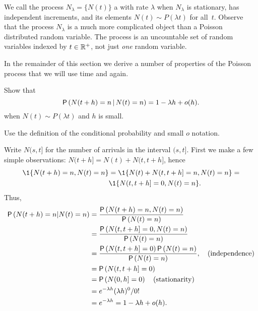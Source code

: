 We call the process $N_\lambda=\{N(t)\}$ a  with rate $\lambda$ when $N_\lambda$ is stationary, has independent increments, and its elements $N(t)\sim P(\lambda t)$ for all~$t$.
Observe that the process $N_\lambda$ is a much more complicated object than a Poisson distributed random variable.
The process is an uncountable set of random variables indexed by $t\in \mathbb{R}^+$, not just \emph{one} random variable.


In the remainder of this section we derive a number of  properties of the Poisson process that we will use time and again.


\begin{exercise}\label{ex:35}
  Show that 
  \begin{equation*}
\P{N(t+h) = n \given N(t) = n} = 1-\lambda h + o(h).
  \end{equation*}
when $N(t) \sim P(\lambda t)$  and $h$ is small. 
\begin{hint}
Use  the definition of the conditional probability and small $o$ notation.

\end{hint}
\begin{solution}
Write $N(s, t]$ for the number of arrivals in the interval $(s,t]$. First we make a few simple observations: $N(t+h]= N(t) + N(t, t+h]$, hence
\begin{equation*}
  \begin{split}
  \1{N(t+h)=n, N(t)=n}
&=  \1{N(t) + N(t, t+h] = n, N(t)=n} = \\
&\1{N(t, t+h] = 0, N(t)=n}.
  \end{split}
\end{equation*}
Thus, 
    \begin{align*}
  \P{N(t+h) = n | N(t) = n} 
&=  \frac{\P{N(t+h) = n, N(t) = n}}{\P{N(t)=n}} \\
&=  \frac{\P{N(t, t+h] = 0,  N(t) = n}}{\P{N(t)=n}} \\
&=  \frac{\P{N(t, t+h] = 0} \P{N(t) = n}}{\P{N(t)=n}}, \quad \text{(independence)}\\
&= \P{N(t, t+h] = 0} \\
&= \P{N(0, h] = 0} \quad\text{(stationarity)} \\
&= e^{-\lambda h} (\lambda h)^0/0! \\
&= e^{-\lambda h} = 1-\lambda h + o(h).
    \end{align*}
\end{solution}
\end{exercise}


